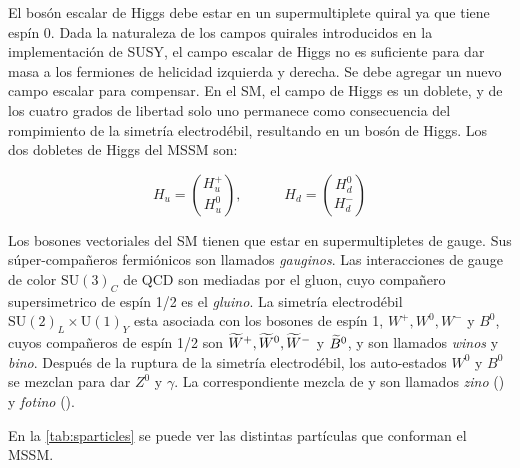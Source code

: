 El bosón escalar de Higgs debe estar en un supermultiplete quiral ya que tiene
espín 0. Dada la naturaleza de los campos quirales introducidos en la
implementación de SUSY, el campo escalar de Higgs no es suficiente para dar masa
a los fermiones de helicidad izquierda y derecha. Se debe agregar un nuevo campo
escalar para compensar. En el SM, el campo de Higgs es un doblete, y de los
cuatro grados de libertad solo uno permanece como consecuencia del rompimiento
de la simetría electrodébil, resultando en un bosón de Higgs. Los dos dobletes
de Higgs del MSSM son:

\begin{equation}
  H_u = \binom{H_u^+}{H_u^0}, \quad \quad \quad H_d = \binom{H_d^0}{H_d^-}
\end{equation}

Los bosones vectoriales del SM tienen que estar en supermultipletes de gauge.
Sus súper-compañeros fermiónicos son llamados \emph{gauginos}. Las interacciones
de gauge de color $\text{SU}(3)_C$ de QCD son mediadas por el gluon, cuyo
compañero supersimetrico de espín 1/2 es el \emph{gluino}. La simetría
electrodébil $\text{SU}(2)_L \times \text{U}(1)_Y$ esta asociada con los bosones
de espín 1, $W^+, W^0, W^-$ y $B^0$, cuyos compañeros de espín 1/2 son $\widetilde{W}^+,
\widetilde{W}^0, \widetilde{W}^-$ y $\widetilde{B}^0$, y son llamados \emph{winos} y
\emph{bino}. Después de la ruptura de la simetría electrodébil, los auto-estados
$W^0$ y $B^0$ se mezclan para dar $Z^0$ y $\gamma$. La correspondiente mezcla de
     {\winozero} y {\bino} son llamados \emph{zino} (\zino) y \emph{fotino}
     (\photino).

En la \cref{tab:sparticles} se puede ver las distintas partículas que
conforman el MSSM.

